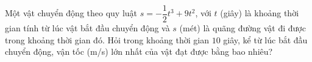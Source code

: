 \begin{bt}%

	Một vật chuyển động theo quy luật $s=-\dfrac12t^3+9t^2$, với $t$ (giây) là khoảng thời gian tính từ lúc vật bắt đầu chuyển động và $s$ (mét) là quãng đường vật đi được trong khoảng thời gian đó. Hỏi trong khoảng thời gian $10$ giây, kể từ lúc bắt đầu chuyển động, vận tốc (m/s) lớn nhất của vật đạt được bằng bao nhiêu?
	
\end{bt}

